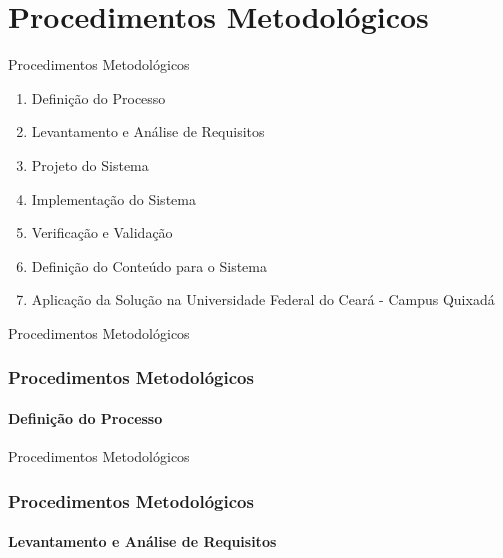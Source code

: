 \documentclass[aspectratio=169]{beamer}
\begin{document}
\section{Procedimentos Metodológicos}

\begin{frame}{Procedimentos Metodológicos}
	\begin{enumerate}
    	\item Definição do Processo
        \item Levantamento e Análise de Requisitos
        \item Projeto do Sistema
        \item Implementação do Sistema
        \item Verificação e Validação
        \item Definição do Conteúdo para o Sistema
        \item Aplicação da Solução na Universidade Federal do Ceará - Campus Quixadá
    \end{enumerate}
\end{frame}


\begin{frame}{Procedimentos Metodológicos}
\frametitle{Procedimentos Metodológicos}
\framesubtitle{Definição do Processo}


\end{frame}


\begin{frame}{Procedimentos Metodológicos}
\frametitle{Procedimentos Metodológicos}
\framesubtitle{Levantamento e Análise de Requisitos}

\begin{overprint}


\end{overprint}

\end{frame}
\end{document}
